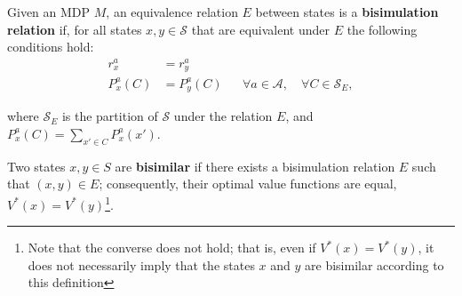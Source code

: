 \begin{definition}
\label{def:bisimulation}
Given an MDP $M$, an equivalence relation $E$ between states is a \textbf{bisimulation relation} if, for all states $x, y \in \mathcal{S}$ that are equivalent under $E$ the following conditions hold:
\begin{align}
\label{eq:reward_equivalence}
r^a_x & = r^a_y \\
\label{eq:transition_equivalence}
P_x^a(C) & = P_y^a(C) & & \forall a \in \mathcal{A}, \quad \forall C \in \mathcal{S}_E,
\end{align}

where $\mathcal{S}_E$ is the partition of $\mathcal{S}$ under the relation $E$, and $P_x^a(C) = \sum_{x' \in C} P_x^a(x')$.

Two states $x, y \in S$ are \textbf{bisimilar} if there exists a bisimulation relation $E$ such that $(x, y) \in E$; consequently, their optimal value functions are equal, \(V^\ast(x) = V^\ast(y)\)\footnote{Note that the converse does not hold; that is, even if \(V^\ast(x) = V^\ast(y)\), it does not necessarily imply that the states $x$ and $y$ are bisimilar according to this definition}.

\end{definition}

